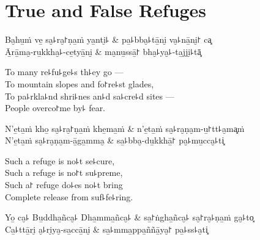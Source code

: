 
\artoptfalse

\chapter{True and False Refuges}


\begin{leader}
\end{leader}

\begin{twochants}
  Ba̮hu̱ṁ ve̱ sa̮꜕ra̮꜓ṇa̱ṁ ya̱nti̮꜕ & pa̱꜕bba̮꜕tā̱ni̮ va̮꜕nā̱ni̮꜓ ca͓ \\
  Ā̱rā̱ma̮-ru̱kkha̮꜕-ce̱tyā̱ni̮ & ma̮nu̱ssā̱꜓ bha̮꜕ya̮꜕-ta̱jji̮꜕tā͓ \\
\end{twochants}

\begin{english}
  To many re꜕fu꜕ge꜕s th꜕ey go ---\\
  To mountain slopes and fo꜓re꜕st glades,\\
  To pa꜕rkla꜕nd shri꜕nes an꜕d sa꜕cre꜕d sites ---\\
  People overco꜓me by꜕ fear.
\end{english}

\begin{twochants}
  N'e̱ta̱ṁ kho̱ sa̮꜕ra̮꜓ṇa̱ṁ khe̱ma̱ṁ & n'e̱ta̱ṁ sa̮꜕ra̮ṇa̮m-u̱꜓tt꜕a̮ma͓ṁ \\
  N'e̱ta̱ṁ sa̮꜕ra̮ṇa̮m-ā̱ga̱mma̮ & sa̱꜕bba̮-du̱kkhā̱꜓ pa̮꜕mu̱cca̮꜕ti͓ \\
\end{twochants}

\begin{english}
  Such a refuge is no꜕t se꜕cure,\\
  Such a refuge is no꜓t su꜕preme,\\
  Such a꜓ refuge do꜕es no꜕t bring\\
  Complete release from suf꜕fe꜕ring.
\end{english}

\begin{twochants}
  Yo̱ ca̮꜕ Bu̱ddha̱ñca̮꜕ Dha̱mma̱ñca̮꜕ & sa̱꜓ṅgha̱ñca̮꜕ sa̮꜓ra̮꜕ṇa̱ṁ ga̮꜕to͓ \\
  Ca̱꜕ttā̱ri̮ a̮꜕ri̮ya̮-sa̱ccā̱ni̮ & sa̱꜕mma̱ppa̱ññā̱ya̮꜓ pa̱꜕ss꜕a̮ti͓ \\
\end{twochants}

